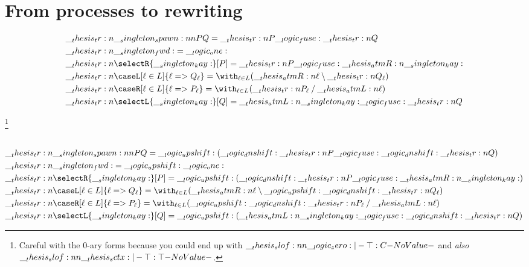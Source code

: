 \chapter{From processes to rewriting}

\begin{equation*}
  \begin{lgathered}
    \tr{\spawn{P}{Q}} = \tr{P} \fuse \tr{Q} \\
    \tr{\fwd} = \one
    \\
    \tr{\selectR{\kay}[P]} = \tr{P} \fuse \atmR{\kay} \\
    \tr{\caseL[\ell \in L]{\ell => Q_{\ell}}} = \with_{\ell \in L}(\atmR{\ell} \limp \tr{Q_{\ell}})
    \\
    \tr{\caseR[\ell \in L]{\ell => P_{\ell}}} = \with_{\ell \in L}(\tr{P_{\ell}} \pmir \atmL{\ell}) \\
    \tr{\selectL{\kay}[Q]} = \atmL{\kay} \fuse \tr{Q}
  \end{lgathered}
\end{equation*}


\footnote{Careful with the 0-ary forms because you could end up with $\slof{\zero |- \top : C}$ and \emph{also} $\slof{\sctx |- \top : \top}$.}

\section{}

\begin{equation*}
  \begin{lgathered}
    \tr{\spawn{P}{Q}} = \up (\dn \tr{P} \fuse \dn \tr{Q}) \\
    \tr{\fwd} = \up \one
    \\
    \tr{\selectR{\kay}[P]} = \up (\dn \tr{P} \fuse \atmR{\kay}) \\
    \tr{\caseL[\ell \in L]{\ell => Q_{\ell}}} = \with_{\ell \in L}(\atmR{\ell} \limp \up \dn \tr{Q_{\ell}})
    \\
    \tr{\caseR[\ell \in L]{\ell => P_{\ell}}} = \with_{\ell \in L}(\up \dn \tr{P_{\ell}} \pmir \atmL{\ell}) \\
    \tr{\selectL{\kay}[Q]} = \up (\atmL{\kay} \fuse \dn \tr{Q})
  \end{lgathered}
\end{equation*}

